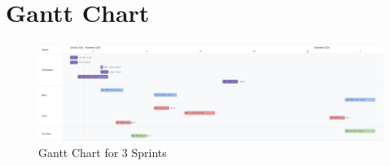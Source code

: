 \documentclass[12pt]{article}
\begin{document}
\section{Gantt Chart}

\begin{figure}[H]
        \centering
        \includegraphics[width=1\linewidth]{images/gantt_chart_for_project.png}
        \caption{Gantt Chart for 3 Sprints}
        \label{fig:4}
\end{figure}
\end{document}

